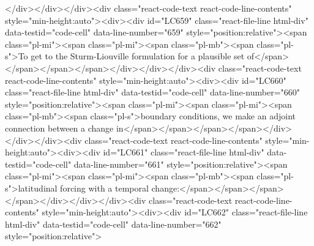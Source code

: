{{{{{{{{</div></div></div><div class="react-code-text react-code-line-contents" style="min-height:auto"><div><div id="LC659" class="react-file-line html-div" data-testid="code-cell" data-line-number="659" style="position:relative"><span class="pl-mi"><span class="pl-mi"><span class="pl-mb"><span class="pl-s">To get to the Sturm-Liouville formulation for a plausible set of</span></span></span></span></div></div></div><div class="react-code-text react-code-line-contents" style="min-height:auto"><div><div id="LC660" class="react-file-line html-div" data-testid="code-cell" data-line-number="660" style="position:relative"><span class="pl-mi"><span class="pl-mi"><span class="pl-mb"><span class="pl-s">boundary conditions, we make an adjoint connection between a change in</span></span></span></span></div></div></div><div class="react-code-text react-code-line-contents" style="min-height:auto"><div><div id="LC661" class="react-file-line html-div" data-testid="code-cell" data-line-number="661" style="position:relative"><span class="pl-mi"><span class="pl-mi"><span class="pl-mb"><span class="pl-s">latitudinal forcing with a temporal change:</span></span></span></span></div></div></div><div class="react-code-text react-code-line-contents" style="min-height:auto"><div><div id="LC662" class="react-file-line html-div" data-testid="code-cell" data-line-number="662" style="position:relative">
}}}}}}}}
